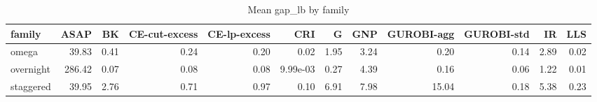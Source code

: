 \begin{table}[htbp]
\centering
\small
\caption{Mean gap\_lb by family}
\label{tab:E6_scalability_b120_by_family}
\begin{tabular}{lrrrrrrrrrrr}
\toprule
family & ASAP & BK & CE-cut-excess & CE-lp-excess & CRI & G & GNP & GUROBI-agg & GUROBI-std & IR & LLS \\
\midrule
omega & 39.83 & 0.41 & 0.24 & 0.20 & 0.02 & 1.95 & 3.24 & 0.20 & 0.14 & 2.89 & 0.02 \\
overnight & 286.42 & 0.07 & 0.08 & 0.08 & 9.99e-03 & 0.27 & 4.39 & 0.16 & 0.06 & 1.22 & 0.01 \\
staggered & 39.95 & 2.76 & 0.71 & 0.97 & 0.10 & 6.91 & 7.98 & 15.04 & 0.18 & 5.38 & 0.23 \\
\bottomrule
\end{tabular}
\end{table}

